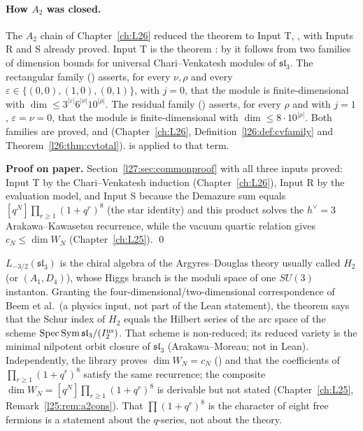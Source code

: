 \paragraph{How $A_2$ was closed.} The $A_2$ chain of Chapter~\ref{ch:L26} reduced the theorem to Input T,
, with Inputs R and S already proved. Input T is the theorem : by
 it follows from two families of dimension bounds for universal Chari--Venkatesh modules of
$\mathfrak{sl}_3$. The rectangular family () asserts, for every $\nu,\rho$ and every
$\varepsilon\in\{(0,0),(1,0),(0,1)\}$, with $j=0$, that the module is finite-dimensional with
$\dim\le3^{|\varepsilon|}6^{|\nu|}10^{|\rho|}$. The residual family () asserts, for every $\rho$ and with
$j=1$, $\varepsilon=\nu=0$, that the module is finite-dimensional with $\dim\le8\cdot10^{|\rho|}$. Both families are proved,  and  (Chapter~\ref{ch:L26},
Definition~\ref{l26:def:cvfamily} and Theorem~\ref{l26:thm:cvtotal}).  is 
applied to that term.

\textbf{Proof on paper.} Section~\ref{l27:sec:commonproof} with all three inputs proved: Input T by the Chari--Venkatesh induction
(Chapter~\ref{ch:L26}), Input R by the evaluation model, and Input S because the Demazure sum equals $[q^N]\prod_{r\ge1}(1+q^r)^8$
(the star identity) and this product solves the $h^\vee=3$ Arakawa--Kawasetsu recurrence, while the vacuum quartic relation gives
$c_N\le\dim W_N$ (Chapter~\ref{ch:L25}). \qed

\begin{physics}
$L_{-3/2}(\mathfrak{sl}_3)$ is the chiral algebra of the Argyres--Douglas theory usually called $H_2$ (or $(A_1,D_4)$), whose Higgs
branch is the moduli space of one $SU(3)$ instanton. Granting the four-dimensional/two-dimensional correspondence of Beem et al.\
(a physics input, not part of the Lean statement), the theorem says that the Schur index of $H_2$ equals the Hilbert series of the
arc space of the scheme $\operatorname{Spec}\operatorname{Sym}\mathfrak{sl}_3/(I_2^{\mathrm{ns}})$. That scheme is non-reduced; its reduced
variety is the minimal nilpotent orbit closure of $\mathfrak{sl}_3$ (Arakawa--Moreau; not in Lean). Independently, the library proves $\dim W_N=c_N$ () and that the coefficients of
$\prod_{r\ge1}(1+q^r)^8$ satisfy the same recurrence; the composite $\dim W_N=[q^N]\prod_{r\ge1}(1+q^r)^8$ is derivable but not stated
(Chapter~\ref{ch:L25}, Remark~\ref{l25:rem:a2cons}). That $\prod(1+q^r)^8$ is the character of eight free fermions is a statement about
the $q$-series, not about the theory.
\end{physics}

